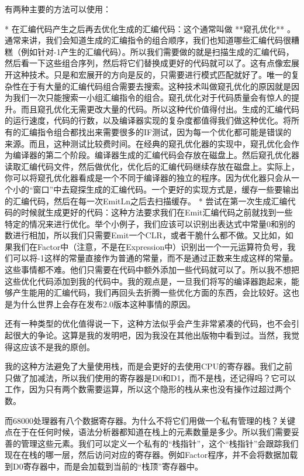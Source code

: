 有两种主要的方法可以使用：

* 在汇编代码产生之后再去优化生成的汇编代码：这个通常叫做 **窥孔优化** 。通常来讲，我们会知道生成的汇编指令的组合顺序，我们也知道哪些汇编代码很糟糕（例如针对-1产生的汇编代码）。所以我们需要做的就是扫描生成的汇编代码，然后看一下这些组合序列，然后将它们替换成更好的代码就可以了。这有点像宏展开这种技术。只是和宏展开的方向是反的，只需要进行模式匹配就好了。唯一的复杂性在于有大量的汇编代码组合需要去搜索。这种技术叫做窥孔优化的原因就是因为我们一次只能搜索一小组汇编指令的组合。窥孔优化对于代码质量会有惊人的提升。而且窥孔优化无需更改大量的代码。所以这种代价值得付出。生成的汇编代码的运行速度，代码的行数，以及编译器实现的复杂度都值得我们做这种优化。将所有的汇编指令组合都找出来需要很多的IF测试，因为每一个优化都可能是错误的来源。而且，这种测试比较费时间。在经典的窥孔优化器的实现中，窥孔优化会作为编译器的第二个阶段。编译器生成的汇编代码会存放在磁盘上。然后窥孔优化器读取汇编代码文件，然后做优化，优化后的汇编代码继续存放在磁盘上。实际上，你可以将窥孔优化器看成是一个不同于编译器的独立的程序。因为优化器只会从一个小的“窗口”中去窥探生成的汇编代码。一个更好的实现方式是，缓存一些要输出的汇编代码，然后在每一次EmitLn之后去扫描缓存。
* 尝试在第一次生成汇编代码的时候就生成更好的代码：这种方法要求我们在Emit汇编代码之前就找到一些特定的情况来进行优化。举个小例子，我们应该可以识别出表达式中常量0和别的数进行相加，所以我们只需要Emit一个CLR，或者干脆什么都不做。又比如，如果我们在Factor中（注意，不是在Expression中）识别出一个一元运算符负号，我们可以将-1这样的常量直接作为普通的常量，而不是通过正数来生成这样的常量。这些事情都不难。他们只需要在代码中额外添加一些代码就可以了。所以我不想把这些优化代码添加到我的代码中。我的观点是，一旦我们将写的编译器跑起来，能够产生能用的汇编代码，我们再回头去折腾一些优化方面的东西，会比较好。这也是为什么世界上会存在发布2.0版本这种事情的原因。

还有一种类型的优化值得说一下，这种方法似乎会产生非常紧凑的代码，也不会引起很大的争论。这算是我的发明吧，因为我没在其他出版物中看到过。当然，我觉得这应该不是我的原创。

我的这种方法避免了大量使用栈，而是会更好的去使用CPU的寄存器。我们之前只做了加减法，所以我们使用的寄存器是D0和D1，而不是栈，还记得吗？它可以工作，因为只有两个数需要运算，所以这个隐形的栈从来也没有操作过超过两个数。

而68000处理器有八个数据寄存器。为什么不将它们用做一个私有管理的栈？关键点在于在任何时候，语法分析器都知道在栈上的元素数量是多少。所以我们需要妥善的管理这些元素。我们可以定义一个私有的“栈指针”，这个“栈指针”会跟踪我们现在在栈的哪一层，然后访问对应的寄存器。例如Factor程序，并不会将数据加载到D0寄存器中，而是会加载到当前的“栈顶”寄存器中。

